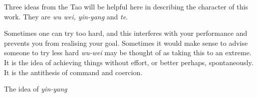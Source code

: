 Three ideas from the Tao will be helpful here in describing the character of this work.
They are {\it wu wei, yin-yang} and {\it te}.

Sometimes one can try too hard, and this interferes with your performance and prevents you from realising your goal.
Sometimes it would make sense to advise someone to try less hard {\it wu-wei} may be thought of as taking this to an extreme.
It is the idea of achieving things without effort, or better perhaps, spontaneously.
It is the antithesis of command and coercion.

The idea of {\it yin-yang}  